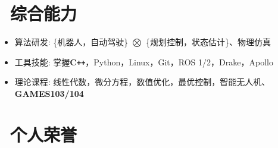 \documentclass{resume}
\begin{document}
\section{\faCogs\ 综合能力}
\begin{itemize}[parsep=0.5ex]
  \item 算法研发: \{机器人，自动驾驶\} $\boldsymbol{\bigotimes}$ \{规划控制，状态估计\}、物理仿真
  \item 工具技能: 掌握\textbf{C\texttt{++}}，Python，Linux，Git，ROS 1/2，Drake，Apollo
  \item 理论课程: 线性代数，微分方程，数值优化，最优控制，智能无人机、\textbf{GAMES103/104}
\end{itemize}

\section{\faHeartO\ 个人荣誉}
\end{document}
